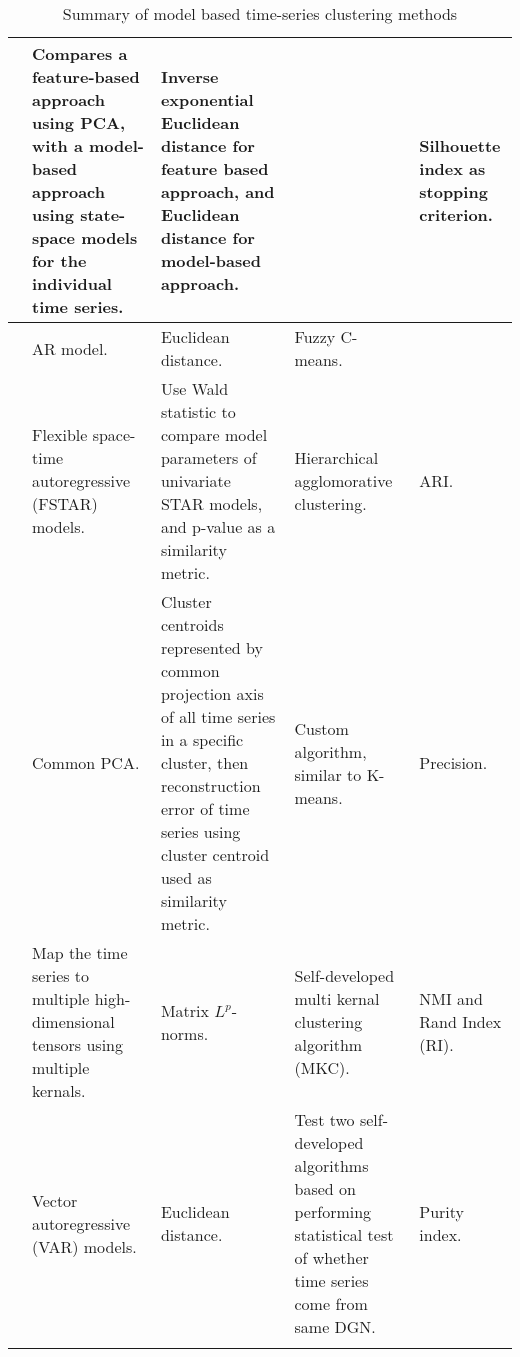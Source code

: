 \begin{longtable}{p{}p{}p{}p{}p{}}
    \cite{load_tsc_state_space_model}       & Compares a feature-based approach using PCA, with a model-based approach using state-space models for the individual time series.& Inverse exponential Euclidean distance for feature based approach, and Euclidean distance for model-based approach.& & Silhouette index as stopping criterion.\\ \hline
    \cite{struct_damage_ar_fuzzy_c_means}   & AR model.& Euclidean distance.& Fuzzy C-means.& \\ \hline
    \cite{fstar_hac_tsc}                    & Flexible space-time autoregressive (FSTAR) models.& Use Wald statistic to compare model parameters of univariate STAR models, and p-value as a similarity metric.& Hierarchical agglomorative clustering.& ARI.\\ \hline
    \cite{multivariate_tsc_common_pca}      & Common PCA.& Cluster centroids represented by common projection axis of all time series in a specific cluster, then reconstruction error of time series using cluster centroid used as similarity metric.& Custom algorithm, similar to K-means.& Precision.\\ \hline
    \cite{tensor_multi_elastic_kernel_tsc}  & Map the time series to multiple high-dimensional tensors using multiple kernals.& Matrix $L^p$-norms.& Self-developed multi kernal clustering algorithm (MKC).& NMI and Rand Index (RI).\\ \hline
    \cite{var_multivar_tsc}                 & Vector autoregressive (VAR) models.& Euclidean distance.& Test two self-developed algorithms based on performing statistical test of whether time series come from same DGN. & Purity index.\\ \hline
    \hline
    \caption{Summary of model based time-series clustering methods}
    \label{tab:machine_learning_wt_cm_summary}
\end{longtable}

